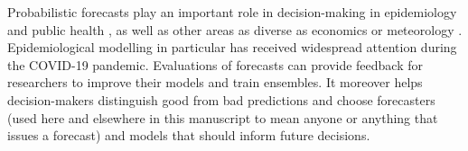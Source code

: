 \documentclass{article}
\begin{document}
Probabilistic forecasts \citep{heldProbabilisticForecastingInfectious2017} play an important role in decision-making in epidemiology and public health \citep{reichCollaborativeMultiyearMultimodel2019, funkShorttermForecastsInform2020, cramerEvaluationIndividualEnsemble2021, bracherShorttermForecastingCOVID192021, europeancovid-19forecasthubEuropeanCovid19Forecast2021, sherrattPredictivePerformanceMultimodel2022}, as well as other areas as diverse as economics \citep{timmermannForecastingMethodsFinance2018, elliottForecastingEconomicsFinance2016} or meteorology \citep{gneitingWeatherForecastingEnsemble2005, kukkonenReviewOperationalRegionalscale2012}. Epidemiological modelling in particular has received widespread attention during the COVID-19 pandemic. Evaluations of forecasts can provide feedback for researchers to improve their models and train ensembles. It moreover helps decision-makers distinguish good from bad predictions and choose forecasters (used here and elsewhere in this manuscript to mean anyone or anything that issues a forecast) and models that should inform future decisions.
\end{document}
